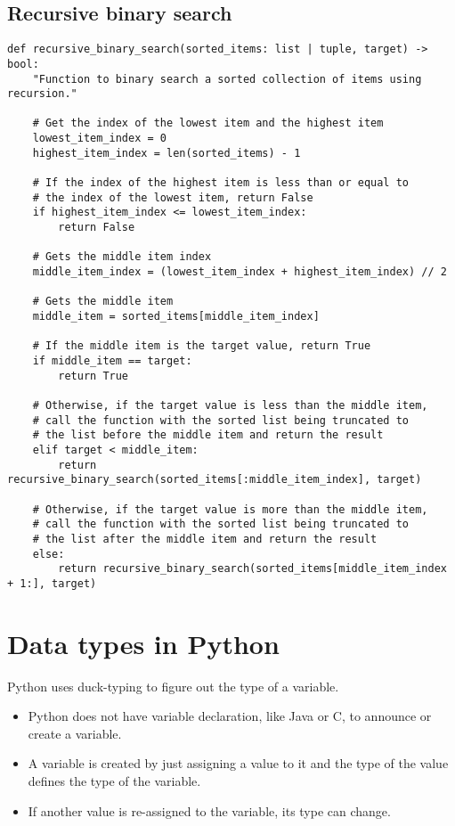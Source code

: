 \documentclass[11pt]{article}
\begin{document}
\subsection{Recursive binary search}
\label{sec:org3719889}
\begin{verbatim}
def recursive_binary_search(sorted_items: list | tuple, target) -> bool:
    "Function to binary search a sorted collection of items using recursion."

    # Get the index of the lowest item and the highest item
    lowest_item_index = 0
    highest_item_index = len(sorted_items) - 1

    # If the index of the highest item is less than or equal to
    # the index of the lowest item, return False
    if highest_item_index <= lowest_item_index:
        return False

    # Gets the middle item index
    middle_item_index = (lowest_item_index + highest_item_index) // 2

    # Gets the middle item
    middle_item = sorted_items[middle_item_index]

    # If the middle item is the target value, return True
    if middle_item == target:
        return True

    # Otherwise, if the target value is less than the middle item,
    # call the function with the sorted list being truncated to
    # the list before the middle item and return the result
    elif target < middle_item:
        return recursive_binary_search(sorted_items[:middle_item_index], target)

    # Otherwise, if the target value is more than the middle item,
    # call the function with the sorted list being truncated to
    # the list after the middle item and return the result
    else:
        return recursive_binary_search(sorted_items[middle_item_index + 1:], target)
\end{verbatim}

 \newpage

\section{Data types in Python}
\label{sec:orgd5ac07a}
Python uses duck-typing to figure out the type of a variable.
\begin{itemize}
\item Python does not have variable declaration, like Java or C, to announce or create a variable.
\item A variable is created by just assigning a value to it and the type of the value defines the type of the variable.
\item If another value is re-assigned to the variable, its type can change.
\end{itemize}
\end{document}
